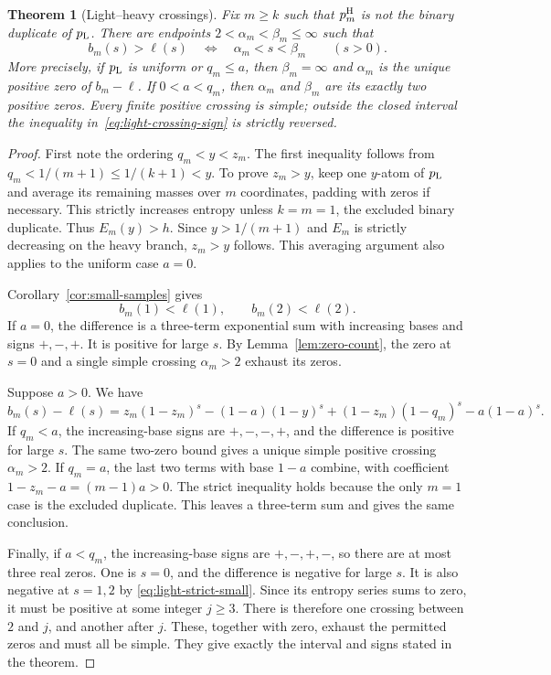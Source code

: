 \documentclass[11pt]{article}
\numberwithin{equation}{section}
\newtheorem{theorem}{Theorem}[section]
\begin{document}
\begin{theorem}[Light--heavy crossings]\label{thm:light-crossing}
Fix $m\ge k$ such that $p_m^{\rm H}$ is not the binary duplicate of
$p_{\rm L}$. There are endpoints
$2<\alpha_m<\beta_m\le\infty$ such that
\begin{equation}\label{eq:light-crossing-sign}
 b_m(s)>\ell(s)\quad\Longleftrightarrow\quad
 \alpha_m<s<\beta_m\qquad(s>0).
\end{equation}
More precisely, if $p_{\rm L}$ is uniform or $q_m\le a$, then
$\beta_m=\infty$ and $\alpha_m$ is the unique positive zero of
$b_m-\ell$. If $0<a<q_m$, then $\alpha_m$ and $\beta_m$ are its
exactly two positive zeros. Every finite positive crossing is simple;
outside the closed interval the inequality in~\eqref{eq:light-crossing-sign}
is strictly reversed.
\end{theorem}
\begin{proof}
First note the ordering $q_m<y<z_m$. The first inequality follows from
$q_m<1/(m+1)\le1/(k+1)<y$. To prove $z_m>y$, keep one $y$-atom of
$p_{\rm L}$ and average its remaining masses over $m$ coordinates, padding
with zeros if necessary. This strictly increases entropy unless $k=m=1$,
the excluded binary duplicate. Thus $E_m(y)>h$. Since
$y>1/(m+1)$ and $E_m$ is strictly decreasing on the heavy branch,
$z_m>y$ follows. This averaging argument also applies to the uniform
case $a=0$.

Corollary~\ref{cor:small-samples} gives
\begin{equation}\label{eq:light-strict-small}
 b_m(1)<\ell(1),\qquad b_m(2)<\ell(2).
\end{equation}
If $a=0$, the difference is a three-term exponential sum with increasing
bases and signs $+,-,+$. It is positive for large $s$. By
Lemma~\ref{lem:zero-count}, the zero at $s=0$ and a single simple
crossing $\alpha_m>2$ exhaust its zeros.

Suppose $a>0$. We have
\[
 b_m(s)-\ell(s)
 =z_m(1-z_m)^s-(1-a)(1-y)^s
  +(1-z_m)(1-q_m)^s-a(1-a)^s.
\]
If $q_m<a$, the increasing-base signs are $+,-,-,+$, and the difference
is positive for large $s$. The same two-zero bound gives a unique simple
positive crossing $\alpha_m>2$. If $q_m=a$, the last two terms with
base $1-a$ combine, with coefficient
$1-z_m-a=(m-1)a>0$. The strict inequality holds because the only $m=1$
case is the excluded duplicate. This leaves a three-term sum and gives
the same conclusion.

Finally, if $a<q_m$, the increasing-base signs are $+,-,+,-$, so there
are at most three real zeros. One is $s=0$, and the difference is negative
for large $s$. It is also negative at $s=1,2$ by
\eqref{eq:light-strict-small}. Since its entropy series sums to zero,
it must be positive at some integer $j\ge3$. There is therefore one
crossing between $2$ and $j$, and another after $j$. These, together
with zero, exhaust the permitted zeros and must all be simple. They give
exactly the interval and signs stated in the theorem.
\end{proof}
\end{document}
